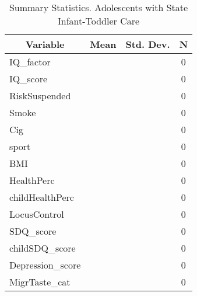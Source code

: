 
\begin{table}[htbp]\centering \caption{Summary Statistics. Adolescents with State Infant-Toddler Care \label{schoolAdolasiloStat}}
\begin{tabular}{l c c  c}\hline\hline
\multicolumn{1}{c}{\textbf{Variable}} & \textbf{Mean}
 & \textbf{Std. Dev.} & \textbf{N}\\ \hline
IQ\_factor &  &   & 0\\
IQ\_score &  &   & 0\\
RiskSuspended &  &   & 0\\
Smoke &  &   & 0\\
Cig &  &   & 0\\
sport &  &   & 0\\
BMI &  &   & 0\\
HealthPerc &  &   & 0\\
childHealthPerc &  &   & 0\\
LocusControl &  &   & 0\\
SDQ\_score &  &   & 0\\
childSDQ\_score &  &   & 0\\
Depression\_score &  &   & 0\\
MigrTaste\_cat &  &   & 0\\
\hline\end{tabular}
\end{table}
